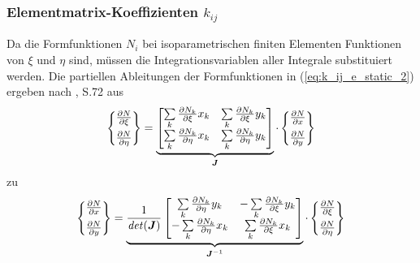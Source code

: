 \subsubsection{Elementmatrix-Koeffizienten $k_{ij}$}

Da die Formfunktionen $N_i$ bei isoparametrischen finiten Elementen Funktionen von $\xi$ und $\eta$ sind, müssen die Integrationsvariablen aller Integrale substituiert werden.  \newline
Die partiellen Ableitungen der Formfunktionen in (\ref{eq:k_ij_e_static_2}) ergeben nach \cite{SMS_VO_skript}, S.72 aus
\begin{equation}
\begin{Bmatrix}
\frac{\partial N}{\partial \xi} \\[2mm]
\frac{\partial N}{\partial \eta}
\end{Bmatrix} = 
\underbrace{
\begin{bmatrix}
\sum\limits_{k}\frac{\partial N_k}{\partial \xi}x_k & \sum\limits_{k}\frac{\partial N_k}{\partial \xi}y_k \\[2mm]
\sum\limits_{k}\frac{\partial N_k}{\partial \eta}x_k & \sum\limits_{k}\frac{\partial N_k}{\partial \eta}y_k
\end{bmatrix}}_{\boldsymbol{J}}\cdot
\begin{Bmatrix}
\frac{\partial N}{\partial x} \\[2mm]
\frac{\partial N}{\partial y}
\end{Bmatrix}
\end{equation}
zu
\begin{equation}
\label{eq:partial_derivatives_subst}
\begin{Bmatrix}
\frac{\partial N}{\partial x} \\[2mm]
\frac{\partial N}{\partial y}
\end{Bmatrix} = 
\underbrace{
	\frac{1}{\mathit{det}(\boldsymbol{J})}\begin{bmatrix}
	 \sum\limits_{k}\frac{\partial N_k}{\partial \eta}y_k & -\sum\limits_{k}\frac{\partial N_k}{\partial \xi}y_k \\[2mm]
	-\sum\limits_{k}\frac{\partial N_k}{\partial \eta}x_k & \sum\limits_{k}\frac{\partial N_k}{\partial \xi}x_k
	\end{bmatrix}}_{\boldsymbol{J}^{-1}}
\cdot \begin{Bmatrix}
\frac{\partial N}{\partial \xi} \\[2mm]
\frac{\partial N}{\partial \eta}
\end{Bmatrix}
\end{equation}


